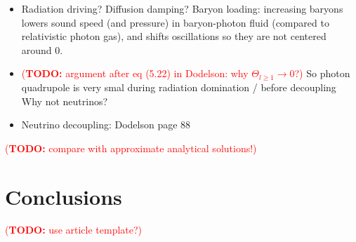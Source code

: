 \documentclass[10pt,a4paper]{article}
\newcommand\TODO[1]{\textcolor{red}{(\textbf{TODO:} #1)}}
\begin{document}
\begin{itemize}
\item
Radiation driving?
Diffusion damping?
Baryon loading: increasing baryons lowers sound speed (and pressure) in baryon-photon fluid (compared to relativistic photon gas),
and shifts oscillations so they are not centered around $0$.

\item
\TODO{argument after eq (5.22) in Dodelson: why $\Theta_{l \geq 1} \rightarrow 0$?}
So photon quadrupole is very smal during radiation domination / before decoupling
Why not neutrinos?

\item
Neutrino decoupling: Dodelson page 88
\end{itemize}

\TODO{compare with approximate analytical solutions!}

\clearpage
\section{Conclusions}

\TODO{use article template?}

%
\printbibliography
\end{document}
